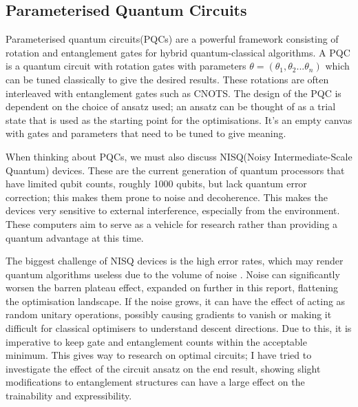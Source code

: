 \documentclass[12pt]{article}
\newcommand{\newp}
    {
    \vskip 0.5cm 
  }
\numberwithin{equation}{section}
\begin{document}
\subsection{Parameterised Quantum Circuits}
Parameterised quantum circuits(PQCs) are a powerful framework consisting of rotation 
and entanglement gates for hybrid quantum-classical algorithms. A PQC is a quantum 
circuit with rotation gates with parameters $\theta = (\theta_1, \theta_2...\theta_n)$
which can be tuned classically to give the desired results. These rotations are often 
interleaved with entanglement gates such as CNOTS. The design of the PQC is 
dependent on the choice of ansatz used; an ansatz can be thought of as a trial 
state that is used as the starting point 
for the optimisations. It's an empty canvas with gates and parameters that need 
to be tuned to give meaning.
\newp 
When thinking about PQCs, we must also discuss NISQ(Noisy Intermediate-Scale 
Quantum) devices. These are the current generation of quantum processors that 
have limited qubit counts, roughly 1000 qubits, but lack quantum error correction; 
this makes them prone to noise and decoherence. This makes the devices very sensitive 
to external interference, especially from the environment. These computers aim 
to serve as a vehicle for research rather than providing a quantum advantage 
at this time.
\newp
The biggest challenge of NISQ devices is the high error rates, which may render 
quantum algorithms useless due to the volume of noise \autocite{preskill_2018_quantum}. Noise can significantly 
worsen the barren plateau effect, expanded on further in this report, flattening 
the optimisation landscape. If the noise grows, it can have the effect of acting 
as random unitary operations, possibly causing gradients to vanish or making it 
difficult for classical optimisers to understand descent directions. 
Due to this, it is imperative to keep gate and entanglement counts within the acceptable 
minimum. This gives way to research on optimal circuits; I have tried to investigate 
the effect of the circuit ansatz on the end result, showing slight modifications 
to entanglement structures can have a large effect on the trainability and 
expressibility. 
\end{document}
